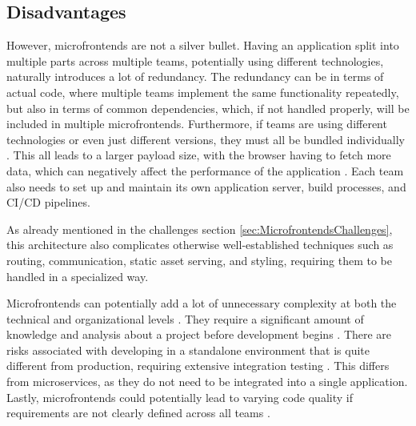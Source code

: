 \subsection{Disadvantages}
However, microfrontends are not a silver bullet. Having an application split into multiple parts across multiple teams, potentially using different technologies, naturally introduces a lot of redundancy. The redundancy can be in terms of actual code, where multiple teams implement the same functionality repeatedly, but also in terms of common dependencies, which, if not handled properly, will be included in multiple microfrontends. Furthermore, if teams are using different technologies or even just different versions, they must all be bundled individually \cite{Geers, Peltonen}. This all leads to a larger payload size, with the browser having to fetch more data, which can negatively affect the performance of the application \cite{Peltonen, Montelius, Jackson}. Each team also needs to set up and maintain its own application server, build processes, and CI/CD pipelines.

As already mentioned in the challenges section \ref{sec:MicrofrontendsChallenges}, this architecture also complicates otherwise well-established techniques such as routing, communication, static asset serving, and styling, requiring them to be handled in a specialized way.

Microfrontends can potentially add a lot of unnecessary complexity at both the technical and organizational levels \cite{Peltonen}. They require a significant amount of knowledge and analysis about a project before development begins \cite{Montelius, Peltonen}. There are risks associated with developing in a standalone environment that is quite different from production, requiring extensive integration testing \cite{Jackson, Montelius, Peltonen}. This differs from microservices, as they do not need to be integrated into a single application. Lastly, microfrontends could potentially lead to varying code quality if requirements are not clearly defined across all teams \cite{Montelius}.